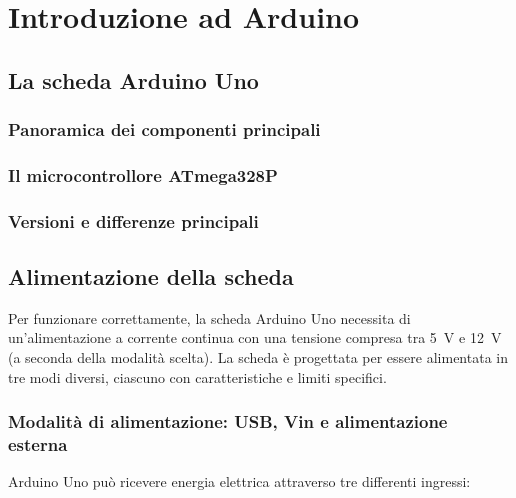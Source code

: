\chapter{Introduzione ad Arduino}

\section{La scheda Arduino Uno}
\subsection*{Panoramica dei componenti principali}
\subsection*{Il microcontrollore ATmega328P}
\subsection*{Versioni e differenze principali}

\section{Alimentazione della scheda}

Per funzionare correttamente, la scheda Arduino Uno necessita di un'alimentazione a corrente continua con una tensione compresa tra \SI{5}{\volt} e \SI{12}{\volt} (a seconda della modalità scelta). La scheda è progettata per essere alimentata in tre modi diversi, ciascuno con caratteristiche e limiti specifici.

\subsection*{Modalità di alimentazione: USB, Vin e alimentazione esterna}

Arduino Uno può ricevere energia elettrica attraverso tre differenti ingressi:

